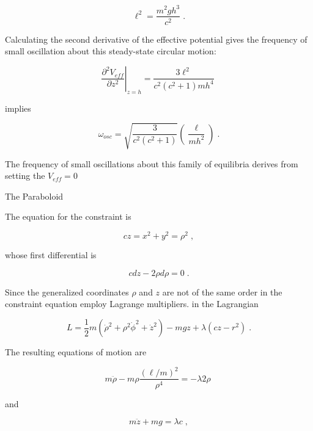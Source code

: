 \documentclass[12pt]{article}
\begin{document}
\[ \ell^2  = \frac{m^2 g h^3}{c^2} \; .\]

Calculating the second derivative of the effective potential gives the frequency of small oscillation about this steady-state circular motion:

\[ \left. \frac{\partial^2 V_{eff}}{\partial z^2} \right|_{z=h} = \frac{3 \ell^2}{c^2 (c^2+1) m h^4} \;  \]

implies

\[ \omega_{osc} = \sqrt{ \frac{3}{c^2(c^2+1)} } \left( \frac{\ell}{m h^2} \right) \; .\]


The frequency of small oscillations about this family of equilibria derives from setting the $V_{eff} = 0 $


The Paraboloid

The equation for the constraint is 

\[ c z = x^2 + y^2 = \rho^2  \; , \]

whose first differential is

\[ c dz - 2 \rho d\rho = 0 \; .\]

Since the generalized coordinates $\rho$ and $z$ are not of the same order in the constraint equation employ Lagrange multipliers.   in the Lagrangian

\[ L = \frac{1}{2} m \left( \dot \rho^2 + \rho^2 \dot \phi ^2 + \dot z^2 \right) - mgz + \lambda (c z - r^2) \; .\]

The resulting equations of motion are

\[m \ddot \rho - m \rho \frac{(\ell/m)^2}{\rho^4} = - \lambda 2 \rho \; \]

and

\[m \ddot z + m g = \lambda c \; , \]
\end{document}
